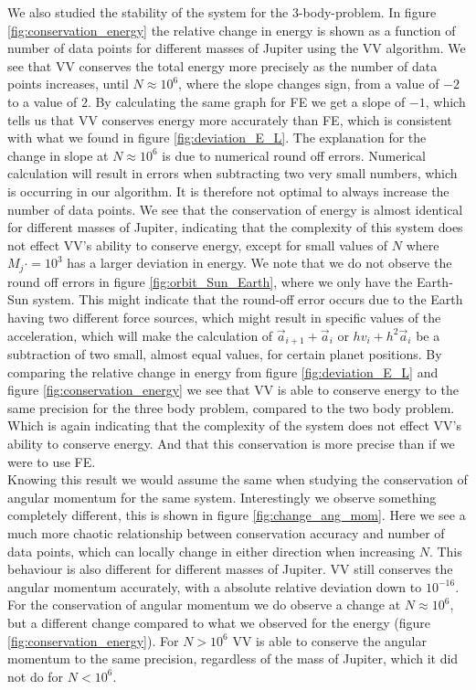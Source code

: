 \documentclass[%
 reprint,
nofootinbib,
aps,
]{revtex4-1}
\begin{document}
We also studied the stability of the system for the 3-body-problem. In figure \vref{fig:conservation_energy} the relative change in energy is shown as a function of number of data points for different masses of Jupiter using the VV algorithm. We see that VV conserves the total energy more precisely as the number of data points increases, until $N\approx 10^6$, where the slope changes sign, from a value of $-2$ to a value of $2$. By calculating the same graph for FE we get a slope of $-1$, which tells us that VV conserves energy more accurately than FE, which is consistent with what we found in figure \vref{fig:deviation_E_L}. The explanation for the change in slope at $N\approx 10^6$ is due to numerical round off errors. Numerical calculation will result in errors when subtracting two very small numbers, which is occurring in our algorithm. It is therefore not optimal to always increase the number of data points. We see that the conservation of energy is almost identical for different masses of Jupiter, indicating that the complexity of this system does not effect VV's ability to conserve energy, except for small values of $N$ where $M_j\cdot=10^3$ has a larger deviation in energy. We note that we do not observe the round off errors in figure \vref{fig:orbit_Sun_Earth}, where we only have the Earth-Sun system.
This might indicate that the round-off error occurs due to the Earth having two different force sources, which might result in specific values of the acceleration, which will make the calculation of  $\vec{a}_{i+1}+\vec{a}_i$ or $hv_i + h^2\vec{a}_i$ be a subtraction of two small, almost equal values, for certain planet positions.
By comparing the relative change in energy from figure \vref{fig:deviation_E_L} and figure \vref{fig:conservation_energy} we see that VV is able to conserve energy to the same precision for the three body problem, compared to the two body problem. Which is again indicating that the complexity of the system does not effect VV's ability to conserve energy. And that this conservation is more precise than if we were to use FE. \\
Knowing this result we would assume the same when studying the conservation of angular momentum for the same system. Interestingly we observe something completely different, this is shown in figure \vref{fig:change_ang_mom}. Here we see a much more chaotic relationship between conservation accuracy and number of data points, which can locally change in either direction when increasing $N$. This behaviour is also different for different masses of Jupiter. VV still conserves the angular momentum accurately, with a absolute relative deviation down to $10^{-16}$. For the conservation of angular momentum we do observe a change at $N\approx 10^{6}$, but a different change compared to what we observed for the energy (figure \vref{fig:conservation_energy}). For $N > 10^{6}$ VV is able to conserve the angular momentum to the  same precision, regardless of the mass of Jupiter, which it did not do for $N<10^{6}$.
\end{document}
